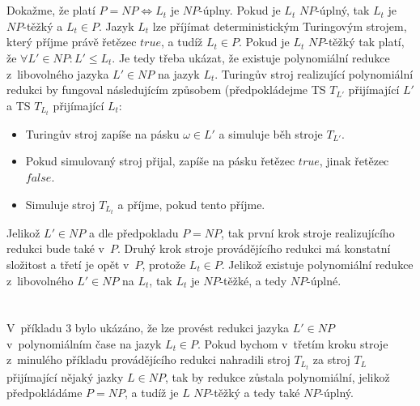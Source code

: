 \documentclass[a4paper]{article}
\newcommand{\ltl}{L_t}
\begin{document}
\section*{}
Dokažme, že platí $P=NP \Leftrightarrow \ltl$ je $NP$-úplny.
Pokud je $\ltl$ $NP$-úplný, tak $\ltl$ je $NP$-těžký a $\ltl \in P$.
Jazyk $\ltl$ lze příjímat deterministickým Turingovým strojem, který příjme právě řetězec $true$, a tudíž $\ltl \in P$.
Pokud je $\ltl$ $NP$-těžký tak platí, že $\forall L' \in NP: L' \leq \ltl$.
Je tedy třeba ukázat, že existuje polynomiální redukce z~libovolného jazyka $L' \in NP$ na jazyk $\ltl$.
Turingův stroj realizující polynomiální redukci by fungoval následujícím způsobem (předpokládejme TS $T_{L'}$ přijímající $L'$ a TS $T_{\ltl}$
přijímající $\ltl$:
\begin{itemize}
    \item Turingův stroj zapíše na pásku $\omega \in L'$ a simuluje běh stroje $T_{L'}$.
    \item Pokud simulovaný stroj přijal, zapíše na pásku řetězec $true$, jinak řetězec $false$.
    \item Simuluje stroj $T_{\ltl}$ a příjme, pokud tento příjme.
\end{itemize}
Jelikož $L' \in NP$ a dle předpokladu $P=NP$, tak první krok stroje realizujícího redukci bude také v~$P$.
Druhý krok stroje provádějícího redukci má konstatní složitost a třetí je opět v~$P$, protože $\ltl \in P$.
Jelikož existuje polynomiální redukce z~libovolného $L' \in NP$ na $\ltl$, tak $\ltl$ je $NP$-těžké, a tedy $NP$-úplné.

\section*{}
V~příkladu 3 bylo ukázáno, že lze provést redukci jazyka $L' \in NP$ v~polynomiálním čase na jazyk $\ltl \in P$.
Pokud bychom v~třetím kroku stroje z~minulého příkladu provádějícího redukci nahradili stroj $T_{\ltl}$ za stroj $T_L$ přijímající
nějaký jazky $L\in NP$, tak by redukce zůstala polynomiální, jelikož předpokládáme $P=NP$, a tudíž je $L$ $NP$-těžký a tedy také
$NP$-úplný.
\end{document}
